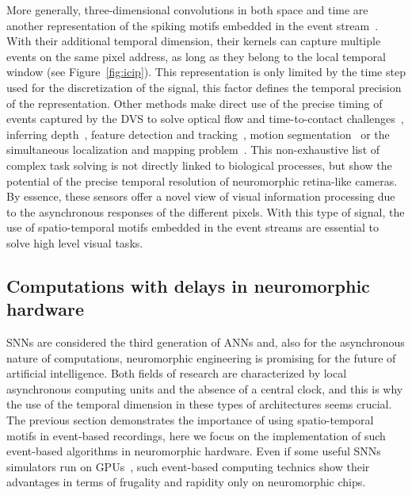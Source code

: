 \documentclass[brainsci, %
               review,submit,pdftex,moreauthors
               ]{Definitions/mdpi}
\begin{document}
More generally, three-dimensional convolutions in both space and time are another representation of the spiking motifs embedded in the event stream~\citep{ghosh_spatiotemporal_2019, grimaldi_learning_2022, yu_stsc-snn_2022}. With their additional temporal dimension, their kernels can capture multiple events on the same pixel address, as long as they belong to the local temporal window (see Figure~\ref{fig:icip}). This representation is only limited by the time step used for the discretization of the signal, this factor defines the temporal precision of the representation. Other methods make direct use of the precise timing of events captured by the DVS to solve optical flow and time-to-contact challenges~\citep{benosman_event-based_2014, clady_asynchronous_2014, tschechne_bio-inspired_2014}, inferring depth~\citep{hidalgo-carrio_learning_2020}, feature detection and tracking~\citep{dardelet_event-by-event_2021}, motion segmentation~\citep{stoffregen_event-based_2019} or the simultaneous localization and mapping problem~\citep{kim_real-time_2016}. This non-exhaustive list of complex task solving is not directly linked to biological processes, but show the potential of the precise temporal resolution of neuromorphic retina-like cameras. By essence, these sensors offer a novel view of visual information processing due to the asynchronous responses of the different pixels. With this type of signal, the use of spatio-temporal motifs embedded in the event streams are essential to solve high level visual tasks. 
%
\subsection{Computations with delays in neuromorphic hardware}
%
SNNs are considered the third generation of ANNs and, also for the asynchronous nature of computations, neuromorphic engineering is promising for the future of artificial intelligence. Both fields of research are characterized by local asynchronous computing units and the absence of a central clock, and this is why the use of the temporal dimension in these types of architectures seems crucial. The previous section demonstrates the importance of using spatio-temporal motifs in event-based recordings, here we focus on the implementation of such event-based algorithms in neuromorphic hardware. Even if some useful SNNs simulators run on GPUs~\citep{diesmann_nest_2003, hazan_bindsnet_2018, stimberg_brian_2019}, such event-based computing technics show their advantages in terms of frugality and rapidity only on neuromorphic chips. 
\end{document}
